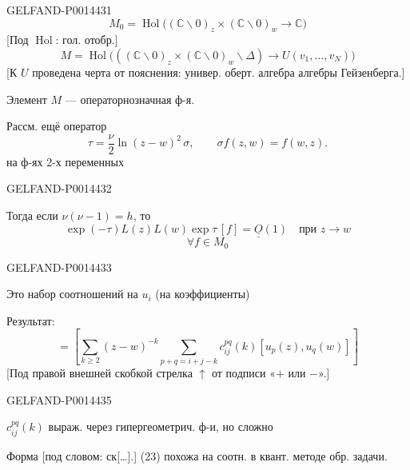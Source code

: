 \begin{GelfandAdjacentEvidence}{GELFAND-P001443}{1}
\[
M_0=\operatorname{Hol}\bigl((\mathbb C\backslash0)_z\times
(\mathbb C\backslash0)_w\longrightarrow\mathbb C\bigr)
\]
[Под \(\operatorname{Hol}\): гол. отобр.]
\[
M=\operatorname{Hol}\bigl(((\mathbb C\backslash0)_z\times
(\mathbb C\backslash0)_w\backslash\Delta)\longrightarrow U(v_1,\ldots,v_N)\bigr)
\]
[К \(U\) проведена черта от пояснения: универ. оберт. алгебра алгебры Гейзенберга.]

Элемент \(M\) — операторнозначная ф-я.

Рассм. ещё оператор
\[
\tau=\frac{\nu}{2}\ln(z-w)^2\,\sigma,\qquad \sigma f(z,w)=f(w,z).
\]
на ф-ях 2-х переменных
\end{GelfandAdjacentEvidence}
\begin{GelfandAdjacentEvidence}{GELFAND-P001443}{2}


Тогда если \(\nu(\nu-1)=h\), то
\begin{equation*}
\exp(-\tau)L(z)L(w)\exp\tau\,[f]=\underline{\underline{O}}(1)
\quad\text{при }z\longrightarrow w \tag{23}
\end{equation*}
\[
\forall f\in M_0
\]
\end{GelfandAdjacentEvidence}
\begin{GelfandAdjacentEvidence}{GELFAND-P001443}{3}


Это набор соотношений на \(u_i\) (на коэффициенты)

Результат:
\begin{equation*}
[u_i(z),u_j(w)]=
\left[\sum_{k\geq2}(z-w)^{-k}
\sum_{p+q=i+j-k}c_{ij}^{pq}(k)[u_p(z),u_q(w)]\right] \tag{24}
\end{equation*}
[Под правой внешней скобкой стрелка \(\uparrow\) от подписи «\(+\) или \(-\)».]

\end{GelfandAdjacentEvidence}
\begin{GelfandAdjacentEvidence}{GELFAND-P001443}{5}


\(c_{ij}^{pq}(k)\) выраж. через гипергеометрич. ф-и, но сложно

Форма [под словом: ск[…].] (23) похожа на соотн. в квант. методе обр. задачи.
\end{GelfandAdjacentEvidence}

